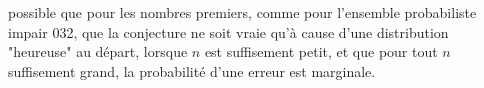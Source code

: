\documentclass[../main.text]{report}
\begin{document}
possible que pour les nombres premiers, comme pour l'ensemble probabiliste impair 032, que la conjecture ne soit vraie qu'à cause d'une distribution "heureuse" au départ, lorsque $n$ est suffisement petit, et que pour tout $n$ suffisement grand, la probabilité d'une erreur est marginale. 



\end{document}
